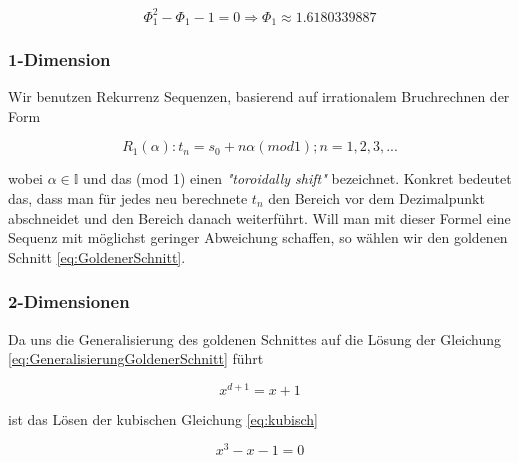 \begin{tcolorbox}[rightrule=3mm, rounded corners=east]
    \begin{equation}\label{eq:GoldenerSchnitt}
        \Phi_{1}^{2} - \Phi_{1} - 1 = 0 \Longrightarrow \Phi_{1} \approx 1.6180339887
    \end{equation}
\end{tcolorbox}

\label{subsec:1-Dimension}
\subsubsection{1-Dimension}
Wir benutzen Rekurrenz Sequenzen, basierend auf irrationalem 
Bruchrechnen der Form

\begin{tcolorbox}[rightrule=3mm, rounded corners=east]
    \begin{equation}\label{eq:Rekurrenz Sequenz}
        R_{1}(\alpha) : t_n = s_0 + n\alpha(mod 1); n = 1,2,3,...
    \end{equation}
\end{tcolorbox}

wobei $\alpha \in \mathbb{I}$ und das (mod 1) einen \textit{"toroidally shift"}
bezeichnet. Konkret bedeutet das, dass man für jedes neu berechnete $t_{n}$ den Bereich vor dem Dezimalpunkt abschneidet 
und den Bereich danach weiterführt. Will man mit dieser Formel eine Sequenz mit möglichst geringer
Abweichung schaffen, so wählen wir den goldenen Schnitt \ref{eq:GoldenerSchnitt}.

\label{subsec:2-Dimensionen}
\subsubsection{2-Dimensionen}

Da uns die Generalisierung des goldenen Schnittes auf die Lösung der Gleichung
\ref{eq:GeneralisierungGoldenerSchnitt} führt

\begin{tcolorbox}[rightrule=3mm, rounded corners=east]
    \begin{equation}\label{eq:GeneralisierungGoldenerSchnitt}
        x^{d+1} = x+1
    \end{equation}
\end{tcolorbox}

ist das Lösen der kubischen Gleichung \ref{eq:kubisch}

\begin{tcolorbox}[rightrule=3mm, rounded corners=east]
    \begin{equation}\label{eq:kubisch}
        x^{3} - x - 1 = 0
    \end{equation}
\end{tcolorbox}


